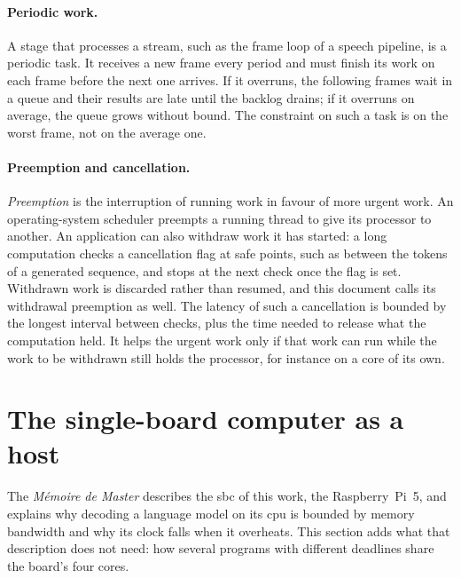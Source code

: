 \paragraph{Periodic work.} A stage that processes a stream, such as the frame loop of a speech
pipeline, is a periodic task. It receives a new frame every period and must finish its work on each
frame before the next one arrives. If it overruns, the following frames wait in a queue and their
results are late until the backlog drains; if it overruns on average, the queue grows without
bound. The constraint on
such a task is on the worst frame, not on the average one.

\paragraph{Preemption and cancellation.} \emph{Preemption} is the interruption of running work in
favour of more urgent work. An operating-system scheduler preempts a running thread to give its
processor to another. An application can also withdraw work it has started: a long computation
checks a cancellation flag at safe points, such as between the tokens of a generated sequence, and
stops at the next check once the flag is set. Withdrawn work is discarded rather than resumed, and
this document calls its withdrawal preemption as well. The latency of such a cancellation is bounded
by the longest interval between checks, plus the time needed to release what the computation held.
It helps the urgent work only if that work can run while the work to be withdrawn still holds the
processor, for instance on a core of its own.

\noautobreak
\section{The single-board computer as a host}
\label{sec:bg-sbc}
The \emph{M\'emoire de Master} describes the \gls{sbc} of this work, the Raspberry~Pi~5, and
explains why decoding a language model on its \gls{cpu} is bounded by memory bandwidth and why its
clock falls when it overheats. This section adds what that description does not need: how several
programs with different deadlines share the board's four cores.

